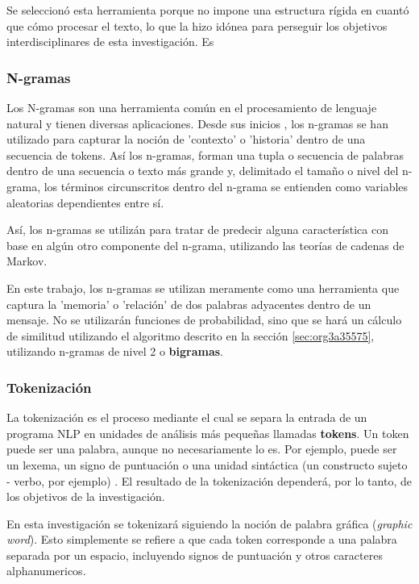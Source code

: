\documentclass[12pt,letterpaper,twoside]{article}
\begin{document}
Se seleccionó esta herramienta porque no impone una estructura
rígida en cuantó que cómo procesar el texto, lo que la hizo
idónea para perseguir los objetivos interdisciplinares de esta
investigación. Es

\subsubsection{N-gramas}
\label{sec:org29f4f04}

Los N-gramas son una herramienta común en el procesamiento
de lenguaje natural y tienen diversas aplicaciones. Desde sus
inicios \cite{manning1999foundations}, los n-gramas se han
utilizado para capturar la noción de 'contexto' o 'historia'
dentro de una secuencia de tokens. Así los n-gramas, forman
una tupla o secuencia de palabras dentro de una secuencia
o texto más grande y, delimitado el tamaño o nivel del
n-grama, los términos circunscritos dentro del n-grama
se entienden como variables aleatorias dependientes entre sí.

Así, los n-gramas se utilizán para tratar de predecir alguna
característica con base en algún otro componente del n-grama,
utilizando las teorías de cadenas de Markov.

En este trabajo, los n-gramas se utilizan meramente
como una herramienta que captura la 'memoria' o 'relación'
de dos palabras adyacentes dentro de un mensaje. No se
utilizarán funciones de probabilidad, sino que se hará
un cálculo de similitud utilizando el algoritmo descrito
en la sección  \ref{sec:org3a35575}, utilizando
n-gramas de nivel 2 o \textbf{bigramas}.


\subsubsection{Tokenización}
\label{sec:org3208890}
La tokenización es el proceso mediante el cual se separa la entrada
de un programa NLP en unidades de análisis más pequeñas llamadas
\textbf{tokens}. Un token puede ser una palabra, aunque no necesariamente
lo es. Por ejemplo, puede ser un lexema, un signo de puntuación
o una unidad sintáctica (un constructo sujeto - verbo, por ejemplo)
\cite{manning1999foundations}. El resultado de la tokenización
dependerá, por lo tanto, de los objetivos de la investigación.

En esta investigación se tokenizará siguiendo la noción de
palabra gráfica (\emph{graphic word}). Esto simplemente se refiere
a que cada token corresponde a una palabra separada por un espacio,
incluyendo signos de puntuación y otros caracteres alphanumericos.
\end{document}
